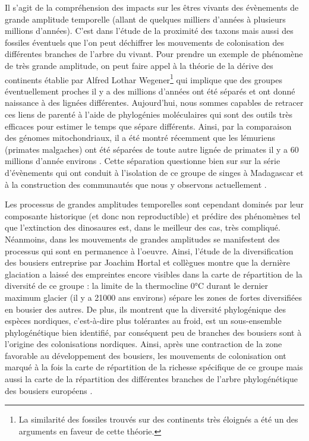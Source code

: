 Il s'agit de la compréhension des impacts sur les êtres vivants des
évènements de grande amplitude temporelle (allant de quelques milliers
d'années à plusieurs millions d'années). C'est dans l'étude de la
proximité des taxons mais aussi des fossiles éventuels que l'on peut
déchiffrer les mouvements de colonisation des différentes branches de
l'arbre du vivant. Pour prendre un exemple de phénomène de très grande
amplitude, on peut faire appel à la théorie de la dérive des continents
établie par Alfred Lothar Wegener\footnote{La similarité des fossiles
  trouvés sur des continents très éloignés a été un des arguments en
  faveur de cette théorie.} qui implique que des groupes éventuellement
proches il y a des millions d'années ont été séparés et ont donné
naissance à des lignées différentes. Aujourd'hui, nous sommes capables
de retracer ces liens de parenté à l'aide de phylogénies moléculaires
qui sont des outils très efficaces pour estimer le temps que sépare
différents. Ainsi, par la comparaison des génomes mitochondriaux, il a
été montré récemment que les lémuriens (primates malgaches) ont été
séparées de toute autre lignée de primates il y a 60 millions d'année
environs \citep{Finstermeier2013}. Cette séparation questionne bien sur
sur la série d'évènements qui ont conduit à l'isolation de ce groupe de
singes à Madagascar et à la construction des communautés que nous y
observons actuellement \citep{Razafindratsima2013}.

Les processus de grandes amplitudes temporelles sont cependant dominés
par leur composante historique (et donc non reproductible) et prédire
des phénomènes tel que l'extinction des dinosaures est, dans le meilleur
des cas, très compliqué. Néanmoins, dans les mouvements de grandes
amplitudes se manifestent des processus qui sont en permanence à
l'oeuvre. Ainsi, l'étude de la diversification des bousiers entreprise
par Joachim Hortal et collègues \citep{Hortal2011} montre que la
dernière glaciation a laissé des empreintes encore visibles dans la
carte de répartition de la diversité de ce groupe : la limite de la
thermocline 0°C durant le dernier maximum glacier (il y a 21000 ans
environs) sépare les zones de fortes diversifiées en bousier des autres.
De plus, ils montrent que la diversité phylogénique des espèces
nordiques, c'est-à-dire plus tolérantes au froid, est un sous-ensemble
phylogénétique bien identifié, par conséquent peu de branches des
bousiers sont à l'origine des colonisations nordiques. Ainsi, après une
contraction de la zone favorable au développement des bousiers, les
mouvements de colonisation ont marqué à la fois la carte de répartition
de la richesse spécifique de ce groupe mais aussi la carte de la
répartition des différentes branches de l'arbre phylogénétique des
bousiers européens \citep{Hortal2011}.

